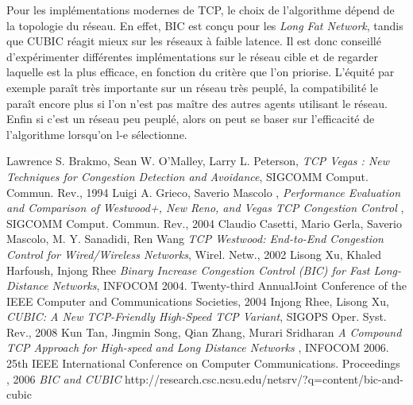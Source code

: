 \documentclass[	DIV=calc,%
							paper=a4,%
							fontsize=11pt,%
							twocolumn]{scrartcl}	 					%
\begin{document}
Pour les implémentations modernes de TCP, le choix de l'algorithme dépend de la topologie du réseau. En effet, BIC est conçu pour les \textit{Long Fat Network}, tandis que CUBIC réagit mieux sur les réseaux à faible latence. Il est donc conseillé d'expérimenter différentes implémentations sur le réseau cible et de regarder laquelle est la plus efficace, en fonction du critère que l'on priorise. L'équité par exemple paraît très importante sur un réseau très peuplé, la compatibilité le paraît encore plus si l'on n'est pas maître des autres agents utilisant le réseau. Enfin si c'est un réseau peu peuplé, alors on peut se baser sur l'efficacité de l'algorithme lorsqu'on l-e sélectionne.
\begin{thebibliography}{9}

\scriptsize{
	Lawrence S. Brakmo, Sean W. O’Malley, Larry L. Peterson,
	\emph{TCP Vegas : New Techniques for Congestion Detection and Avoidance},
	SIGCOMM Comput. Commun. Rev.,
	1994
	Luigi A. Grieco, Saverio Mascolo ,
	\emph{Performance Evaluation and Comparison of Westwood+, New Reno, and Vegas TCP Congestion Control },
	SIGCOMM Comput. Commun. Rev.,
	2004
	Claudio Casetti, Mario Gerla, Saverio Mascolo, M. Y. Sanadidi, Ren Wang
	\emph{TCP Westwood: End-to-End Congestion Control for Wired/Wireless Networks},
	Wirel. Netw.,
	2002
	Lisong Xu, Khaled Harfoush, Injong Rhee
	\emph{ Binary Increase Congestion Control (BIC) for Fast Long-Distance Networks},
	INFOCOM 2004. Twenty-third AnnualJoint Conference of the IEEE Computer and Communications Societies,
	2004
	Injong Rhee, Lisong Xu,
	\emph{CUBIC: A New TCP-Friendly High-Speed TCP Variant},
	SIGOPS Oper. Syst. Rev.,
	2008
	Kun Tan, Jingmin Song, Qian Zhang, Murari Sridharan
	\emph{A Compound TCP Approach for High-speed and Long Distance Networks },
	INFOCOM 2006. 25th IEEE International Conference on Computer Communications. Proceedings		,
	2006
	\emph{BIC and CUBIC}
	http://research.csc.ncsu.edu/netsrv/?q=content/bic-and-cubic}

\end{thebibliography}
\end{document}
